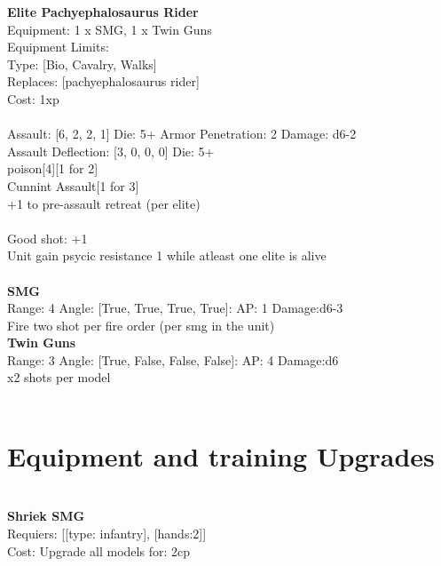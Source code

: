 {\bf Elite Pachyephalosaurus Rider } \\
Equipment: 1 x SMG, 1 x Twin Guns \\
Equipment Limits:  \\
Type: [Bio, Cavalry, Walks] \\
Replaces: [pachyephalosaurus rider] \\
Cost: 1xp\\
\ \\
Assault: [6, 2, 2, 1] Die: 5+ Armor Penetration: 2 Damage: d6-2 \\
Assault Deflection: [3, 0, 0, 0] Die: 5+\\
\indent poison[4][1 for 2]\\ 
Cunnint Assault[1 for 3]\\ 
+1 to pre-assault retreat (per elite)\\ 
 
\ \\
Good shot: +1\\ 
Unit gain psycic resistance 1 while atleast one elite is alive\\ 

\ \\
{\bf SMG } \\



Range: 4  Angle: [True, True, True, True]: AP: 1 Damage:d6-3 \\
Fire two shot per fire order (per smg in the unit)\\ 




{\bf Twin Guns } \\



Range: 3  Angle: [True, False, False, False]: AP: 4 Damage:d6 \\
x2 shots per model\\ 




 
\ \\

\section{Equipment and training Upgrades}\ \\
{\bf Shriek SMG } \\

Requiers: [[type: infantry], [hands:2]] \\
Cost: Upgrade all models for: 2cp \\


